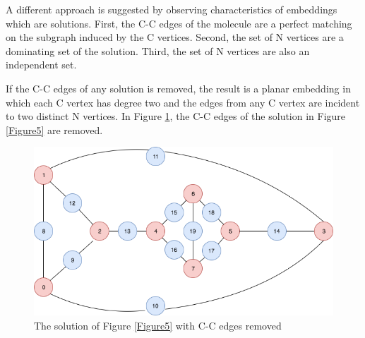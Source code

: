 \documentclass[12pt]{article}
\begin{document}
{\scriptsize
\begin{center}
\begin{table} [H]
\caption{OEIS A002851 Number of unlabeled trivalent (or cubic) connected graphs with 2n nodes. \cite{OEIS} }
\label{table1}
\end{table}
\end{center}}

A different approach is suggested by observing characteristics of embeddings which are solutions. First, the C-C edges of the molecule are a perfect matching on the subgraph induced by the C vertices. Second, the set of N vertices are a dominating set of the solution. Third, the set of N vertices are also an independent set.

If the C-C edges of any solution is removed, the result is a planar embedding in which each C vertex has degree two and the edges from any C vertex are incident to two distinct N vertices. In Figure \ref{Figure7}, the C-C edges of the solution in Figure \ref{Figure5} are removed. 

\begin{figure}[H]
    \includegraphics[scale=.4,center]{Figure7}
    \caption{The solution of Figure \ref{Figure5} with C-C edges removed}
    \label{Figure7}
\end{figure}
\end{document}
